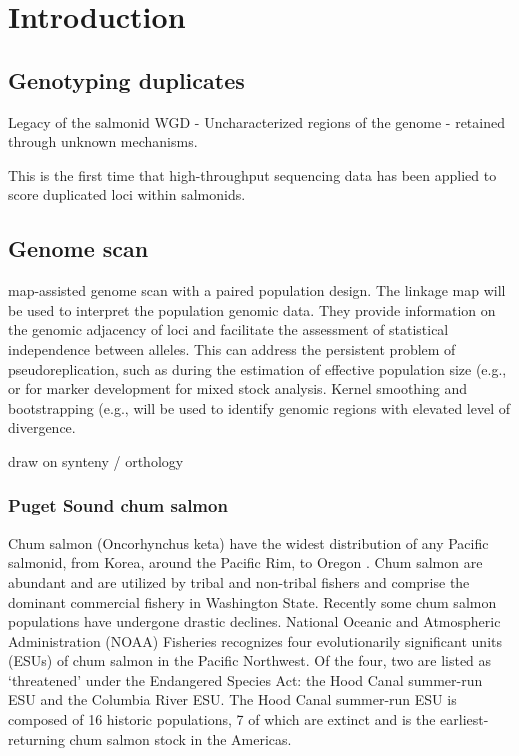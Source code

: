 \documentclass[12pt, one column]{article}
\begin{document}
\section*{Introduction}

\subsection*{Genotyping duplicates}
Legacy of the salmonid WGD - Uncharacterized regions of the genome - retained through unknown mechanisms.  

This is the first time that high-throughput sequencing data has been applied to score duplicated loci within salmonids.

\subsection*{Genome scan}
map-assisted genome scan with a paired population design. The linkage map will be used to interpret the population genomic data. They provide information on the genomic adjacency of loci and facilitate the  assessment of statistical independence between alleles.  This can address the persistent problem of pseudoreplication, such as during the estimation of effective population size (e.g., \citet{Larson2014} or for marker development for mixed stock analysis. Kernel smoothing and bootstrapping (e.g., \citet{Hohenlohe2010} will be used to identify genomic regions with elevated level of divergence.

draw on synteny / orthology 

\subsubsection*{Puget Sound chum salmon}

Chum salmon (Oncorhynchus keta) have the widest distribution of any Pacific salmonid, from Korea, around the Pacific Rim, to Oregon \citep{Salo1991}. Chum salmon are abundant and are utilized by tribal and non-tribal fishers and comprise the dominant commercial fishery in Washington State. Recently some chum salmon populations have undergone drastic declines.  National Oceanic and Atmospheric Administration (NOAA) Fisheries recognizes four evolutionarily significant units (ESUs) of chum salmon in the Pacific Northwest. Of the four, two are listed as ‘threatened’ under the Endangered Species Act: the Hood Canal summer-run ESU and the Columbia River ESU. The Hood Canal summer-run ESU is composed of 16 historic populations, 7 of which are extinct \citep{Good2005} and is the earliest-returning chum salmon stock in the Americas. 
\end{document}
